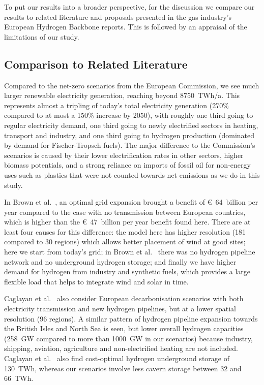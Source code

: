 To put our results into a broader perspective, for the discussion we compare our
results to related literature and proposals presented in the gas industry's
European Hydrogen Backbone reports. This is followed by an appraisal of the
limitations of our study.

\subsection*{Comparison to Related Literature}

Compared to the net-zero scenarios from the European
Commission\cite{in-depth_2018}, we see much larger renewable electricity
generation, reaching beyond 8750~TWh/a. This represents almost a tripling of
today's total electricity generation (270\% compared to at most a 150\% increase
by 2050\cite{in-depth_2018}), with roughly one third going to regular
electricity demand, one third going to newly electrified sectors in heating,
transport and industry, and one third going to hydrogen production (dominated by
demand for Fischer-Tropsch fuels). The major difference to the Commission's
scenarios\cite{in-depth_2018} is caused by their lower electrification rates in
other sectors, higher biomass potentials, and a strong reliance on imports of
fossil oil for non-energy uses such as plastics that were not counted towards
net emissions as we do in this study.

In Brown et al.~\cite{brownSynergiesSector2018}, an optimal grid expansion
brought a benefit of \euro~64~billion per year compared to the case with no
transmission between European countries, which is higher than the
\euro~47~billion per year benefit found here. There are at least four causes for
this difference: the model here has higher resolution (181 compared to 30
regions) which allows better placement of wind at good sites; here we start from
today's grid; in Brown et al.~\cite{brownSynergiesSector2018} there was no
hydrogen pipeline network and no underground hydrogen storage; and finally we
have higher demand for hydrogen from industry and synthetic fuels, which
provides a large flexible load that helps to integrate wind and solar in time.

Caglayan et al.~\cite{Caglayan2019} also consider European decarbonisation
scenarios with both electricity transmission and new hydrogen pipelines, but at
a lower spatial resolution (96 regions). A similar pattern of hydrogen pipeline
expansion towards the British Isles and North Sea is seen, but lower overall
hydrogen capacities (258~GW compared to more than 1000~GW in our scenarios)
because industry, shipping, aviation, agriculture and non-electrified heating
are not included. Caglayan et al.~\cite{Caglayan2019} also find cost-optimal
hydrogen underground storage of 130~TWh, whereas our scenarios involve less
cavern storage between 32 and 66~TWh.


